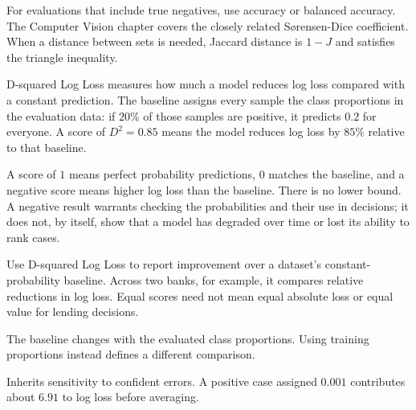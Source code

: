 For evaluations that include true negatives, use accuracy or balanced accuracy. The Computer Vision chapter covers the closely related Sørensen-Dice coefficient. When a distance between sets is needed, Jaccard distance is $1-J$ and satisfies the triangle inequality.

\metricend
\clearpage
\thispagestyle{classificationstyle}
\label{sec:d-squared-log-loss-score}

D-squared Log Loss measures how much a model reduces log loss compared with a constant prediction. The baseline assigns every sample the class proportions in the evaluation data: if $20\%$ of those samples are positive, it predicts $0.2$ for everyone. A score of $D^2=0.85$ means the model reduces log loss by $85\%$ relative to that baseline.

\begin{metricformula}
\end{metricformula}

A score of $1$ means perfect probability predictions, $0$ matches the baseline, and a negative score means higher log loss than the baseline. There is no lower bound. A negative result warrants checking the probabilities and their use in decisions; it does not, by itself, show that a model has degraded over time or lost its ability to rank cases.


Use D-squared Log Loss to report improvement over a dataset's constant-probability baseline. Across two banks, for example, it compares relative reductions in log loss. Equal scores need not mean equal absolute loss or equal value for lending decisions.


{
    \item The baseline changes with the evaluated class proportions. Using training proportions instead defines a different comparison.
    \item Inherits sensitivity to confident errors. A positive case assigned $0.001$ contributes about $6.91$ to log loss before averaging.
}

